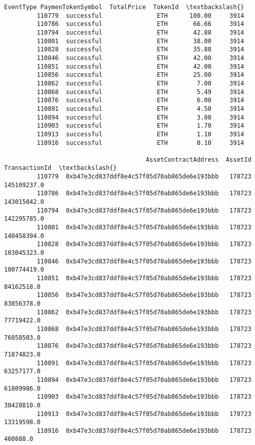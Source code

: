 \documentclass[11pt]{article}
\begin{document}
\begin{Verbatim}[commandchars=\\\{\}]
                  EventType PaymenTokenSymbol  TotalPrice  TokenId  \textbackslash{}
         110779  successful               ETH      100.00     3914   
         110786  successful               ETH       66.66     3914   
         110794  successful               ETH       42.88     3914   
         110801  successful               ETH       38.00     3914   
         110828  successful               ETH       35.88     3914   
         110846  successful               ETH       42.00     3914   
         110851  successful               ETH       42.00     3914   
         110856  successful               ETH       25.00     3914   
         110862  successful               ETH        7.00     3914   
         110868  successful               ETH        5.49     3914   
         110876  successful               ETH        6.00     3914   
         110891  successful               ETH        4.50     3914   
         110894  successful               ETH        3.00     3914   
         110903  successful               ETH        1.70     3914   
         110913  successful               ETH        1.10     3914   
         110916  successful               ETH        0.10     3914   
         
                                       AssetContractAddress  AssetId  TransactionId  \textbackslash{}
         110779  0xb47e3cd837ddf8e4c57f05d70ab865de6e193bbb   178723    145109237.0   
         110786  0xb47e3cd837ddf8e4c57f05d70ab865de6e193bbb   178723    143015042.0   
         110794  0xb47e3cd837ddf8e4c57f05d70ab865de6e193bbb   178723    142295785.0   
         110801  0xb47e3cd837ddf8e4c57f05d70ab865de6e193bbb   178723    140458394.0   
         110828  0xb47e3cd837ddf8e4c57f05d70ab865de6e193bbb   178723    103045323.0   
         110846  0xb47e3cd837ddf8e4c57f05d70ab865de6e193bbb   178723    100774419.0   
         110851  0xb47e3cd837ddf8e4c57f05d70ab865de6e193bbb   178723     84162518.0   
         110856  0xb47e3cd837ddf8e4c57f05d70ab865de6e193bbb   178723     83856378.0   
         110862  0xb47e3cd837ddf8e4c57f05d70ab865de6e193bbb   178723     77719422.0   
         110868  0xb47e3cd837ddf8e4c57f05d70ab865de6e193bbb   178723     76058503.0   
         110876  0xb47e3cd837ddf8e4c57f05d70ab865de6e193bbb   178723     71874823.0   
         110891  0xb47e3cd837ddf8e4c57f05d70ab865de6e193bbb   178723     63257177.0   
         110894  0xb47e3cd837ddf8e4c57f05d70ab865de6e193bbb   178723     61809986.0   
         110903  0xb47e3cd837ddf8e4c57f05d70ab865de6e193bbb   178723     30428810.0   
         110913  0xb47e3cd837ddf8e4c57f05d70ab865de6e193bbb   178723     13319598.0   
         110916  0xb47e3cd837ddf8e4c57f05d70ab865de6e193bbb   178723       460888.0   
         

\end{Verbatim}
\end{document}
